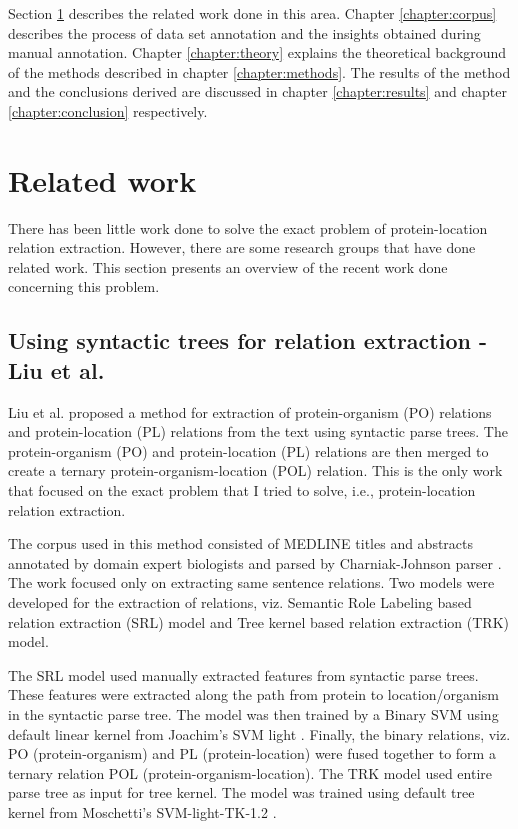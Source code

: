 Section \ref{sec:existingWork} describes the related work done in this area. Chapter \ref{chapter:corpus} describes the process of data set annotation and the insights obtained during manual annotation. Chapter \ref{chapter:theory} explains the theoretical background of the methods described in chapter \ref{chapter:methods}. The results of the method and the conclusions derived are discussed in chapter \ref{chapter:results} and chapter \ref{chapter:conclusion} respectively.

\section{Related work}\label{sec:existingWork}

There has been little work done to solve the exact problem of protein-location relation extraction. However, there are some research groups that have done related work. This section presents an overview of the recent work done concerning this problem.

\subsection{Using syntactic trees for relation extraction - Liu et al.}

Liu et al. \cite{liu2007exploiting} proposed a method for extraction of protein-organism (PO) relations and protein-location (PL) relations from the text using syntactic parse trees. The protein-organism (PO) and protein-location (PL) relations are then merged to create a ternary protein-organism-location (POL) relation. This is the only work that focused on the exact problem that I tried to solve, i.e., protein-location relation extraction.

The corpus used in this method consisted of MEDLINE titles and abstracts annotated by domain expert biologists and parsed by Charniak-Johnson parser \cite{charniak2006multilevel}. The work focused only on extracting same sentence relations. Two models were developed for the extraction of relations, viz. Semantic Role Labeling based relation extraction (SRL) model and Tree kernel based relation extraction (TRK) model. 

The SRL model used manually extracted features from syntactic parse trees. These features were extracted along the path from protein to location/organism in the syntactic parse tree. The model was then trained by a Binary SVM using default linear kernel from Joachim’s SVM light \cite{joachims1999making}. Finally, the binary relations, viz. PO (protein-organism) and PL (protein-location) were fused together to form a ternary relation POL (protein-organism-location). The TRK model used entire parse tree as input for tree kernel. The model was trained using default tree kernel from Moschetti’s SVM-light-TK-1.2 \cite{moschitti2004study}. 

